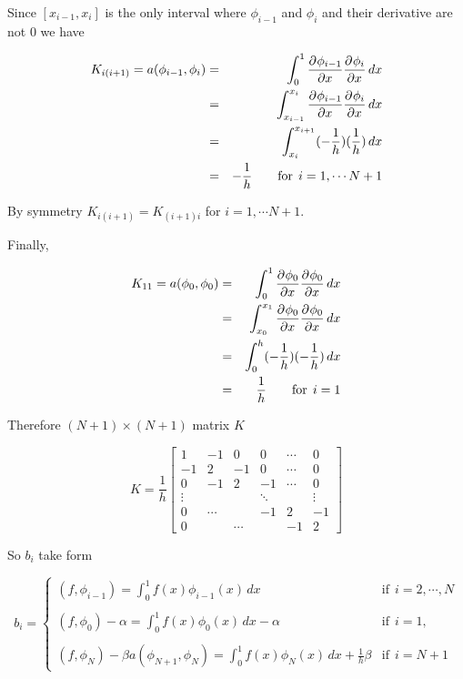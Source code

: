 {\begin{solution}
\begin{enumerate}
Since $[x_{i-1}, x_{i}]$ is the only interval where $\phi_{i-1}$ and $\phi_{i}$ and their derivative  are not $0$ we have 

\begin{eqnarray*}
K_{i(i+1)} = a(\phi_{i-1}, \phi_{i}) &=& \int_0^1 \frac{\partial^{} \phi_{i-1}}{\partial x^{}} \frac{\partial^{} \phi_{i}}{\partial x^{}} \, dx\\
												&=& \int_{x_{i-1}}^{x_{i}}  \frac{\partial^{} \phi_{i-1}}{\partial x^{}} \frac{\partial^{} \phi_{i}}{\partial x^{}} \, dx\\
												&=&\int_{x_{i}}^{x_{i+1}} (-\frac{1}{h}) (\frac{1}{h}) \,dx\\
												&=& -\frac{1}{h}  \qquad \mbox{for}\:\: i=1,\cdots N+1
\end{eqnarray*}

By symmetry $K_{i(i+1)}= K_{(i+1)i}$ for $i=1,\cdots N+1$.

Finally,

\begin{eqnarray*}
K_{11} = a(\phi_{0}, \phi_{0}) &=& \int_0^1 \frac{\partial^{} \phi_{0}}{\partial x^{}} \frac{\partial^{} \phi_{0}}{\partial x^{}} \, dx\\
												&=& \int_{x_{0}}^{x_{1}}  \frac{\partial^{} \phi_{0}}{\partial x^{}} \frac{\partial^{} \phi_{0}}{\partial x^{}} \, dx\\
												&=&\int_{0}^{h} (-\frac{1}{h}) (-\frac{1}{h}) \,dx\\
												&=& \frac{1}{h}  \qquad \mbox{for} \:\:  i=1 
\end{eqnarray*}

Therefore $(N+1)\times (N+1)$ matrix $K$ 

\[
K= \frac{1}{h}\left[\begin{array}{rrrrrrr}
              1 & -1 & 0 & 0 &  \cdots & 0 \\[0.25em]
               -1 & 2 & -1 &0 & \cdots & 0 \\
                0& -1 & 2 & -1 & \cdots & 0\\
                 \vdots & & &\ddots &  & \vdots \\[0.25em]
                 0 & \cdots &  & -1& 2 & -1 \\ 
                 0 & &\cdots &  & -1 & 2 
                   \end{array}\right]
                   \]

So $b_i$ take form 

\[
b_i = \begin{cases}
(f,\phi_{i-1})= \int_{0}^{1} f(x) \phi_{i-1} (x) \, dx  & \mbox{if} \:\: i= 2,\cdots, N\\
\\
(f,\phi_{0}) - \alpha  = \int_{0}^{1} f(x) \phi_{0} (x) \, dx  -\alpha & \mbox{if} \:\: i= 1,\\
\\
(f,\phi_{N}) - \beta a(\phi_{N+1}, \phi_{N})  = \int_{0}^{1} f(x) \phi_{N} (x) \, dx + \frac{1}{h}\beta  & \mbox{if} \:\: i= N+1
\end{cases}
\]


\end{enumerate}
\end{solution}}
